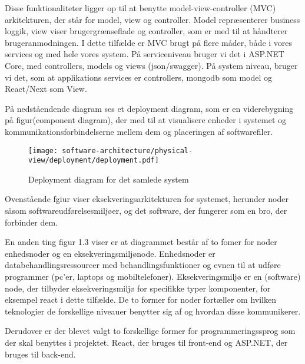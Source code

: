 Disse funktionaliteter ligger op til at benytte model-view-controller (MVC) arkitekturen, der står for model, view og controller. Model repræsenterer business loggik, view viser brugergrænseflade og controller, som er med til at håndterer brugeranmodningen. I dette tilfælde er MVC brugt på flere måder, både i vores services og med hele vores system. På serviceniveau bruger vi det i ASP.NET Core, med controllers, models og views (json/swagger). På system niveau, bruger vi det, som at applikations services er controllers, mongodb som model og React/Next som View.

På nedståendende diagram ses et deployment diagram, som er en viderebygning på figur(component diagram), der med til at visualisere enheder i systemet og kommunikationsforbindelserne mellem dem og placeringen af softwarefiler.


\begin{figure}[H]
    \centering
\texttt{[image: software-architecture/physical-view/deployment/deployment.pdf]}
\caption{Deployment diagram for det samlede system}
\label{fig:figure2}
\end{figure}

Ovenstående fgiur viser eksekveringsarkitekturen for systemet, herunder noder såsom softwareudførelsesmiljøer, og det software, der fungerer som en bro, der forbinder dem. 

En anden ting figur 1.3 viser er at diagrammet består af to fomer for noder enhedsnoder og en eksekveringsmiljønode. Enhedsnoder er databehandlingsressourcer med behandlingsfunktioner og evnen til at udføre programmer (pc'er, laptops og mobiltelefoner).  Eksekveringsmiljø er en (software) node, der tilbyder eksekveringsmiljø for specifikke typer komponenter, for eksempel react i dette tilfælde. De to former for noder fortæller om hvilken teknologier de forskellige niveauer benytter sig af og hvordan disse kommunikerer.

Derudover er der blevet valgt to forskellige former for programmeringssprog som der skal benyttes i projektet. React, der bruges til front-end og ASP.NET, der bruges til back-end. 




